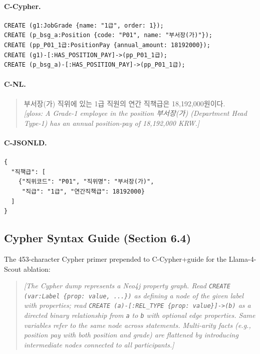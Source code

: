 \paragraph{C-Cypher.}
\begin{verbatim}
CREATE (g1:JobGrade {name: "1급", order: 1});
CREATE (p_bsg_a:Position {code: "P01", name: "부서장(가)"});
CREATE (pp_P01_1급:PositionPay {annual_amount: 18192000});
CREATE (g1)-[:HAS_POSITION_PAY]->(pp_P01_1급);
CREATE (p_bsg_a)-[:HAS_POSITION_PAY]->(pp_P01_1급);
\end{verbatim}

\paragraph{C-NL.}
\begin{quote}
부서장(가) 직위에 있는 1급 직원의 연간 직책급은 18,192,000원이다. \\[2pt]
\textit{[gloss: A Grade-1 employee in the position
부서장(가) (Department Head Type-1) has an annual position-pay of
18{,}192{,}000 KRW.]}
\end{quote}

\paragraph{C-JSONLD.}
\begin{verbatim}
{
  "직책급": [
    {"직위코드": "P01", "직위명": "부서장(가)",
     "직급": "1급", "연간직책급": 18192000}
  ]
}
\end{verbatim}

\subsection{Cypher Syntax Guide (Section 6.4)}

The 453-character Cypher primer prepended to C-Cypher+guide for the
Llama-4-Scout ablation:

\begin{quote}\small
\textit{[The Cypher dump represents a Neo4j property graph. Read
\texttt{CREATE (var:Label \{prop: value, ...\})} as defining a node
of the given label with properties; read
\texttt{CREATE (a)-[:REL\_TYPE \{prop: value\}]->(b)} as a directed
binary relationship from \texttt{a} to \texttt{b} with optional
edge properties. Same variables refer to the same node across
statements. Multi-arity facts (e.g., position pay with both
position and grade) are flattened by introducing intermediate
nodes connected to all participants.]}
\end{quote}
